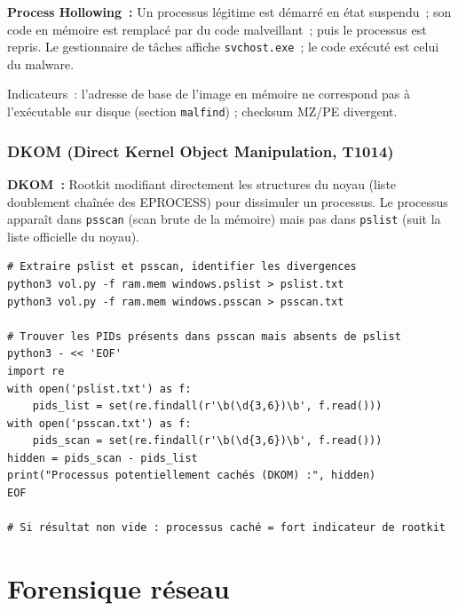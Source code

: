 \begin{boxdef}
\textbf{Process Hollowing~:} Un processus légitime est démarré en état
suspendu~; son code en mémoire est remplacé par du code malveillant~;
puis le processus est repris. Le gestionnaire de tâches affiche
\texttt{svchost.exe}~; le code exécuté est celui du malware.
\end{boxdef}

Indicateurs~: l'adresse de base de l'image en mémoire ne correspond
pas à l'exécutable sur disque (section \texttt{malfind}) ; checksum MZ/PE
divergent.

\subsubsection{DKOM (Direct Kernel Object Manipulation, T1014)}

\begin{boxdef}
\textbf{DKOM~:} Rootkit modifiant directement les structures du noyau
(liste doublement chaînée des EPROCESS) pour dissimuler un processus.
Le processus apparaît dans \texttt{psscan} (scan brute de la mémoire)
mais pas dans \texttt{pslist} (suit la liste officielle du noyau).
\end{boxdef}

\begin{lstlisting}[style=StyleTerminal,
  caption={Détection DKOM --- comparaison pslist vs psscan},
  label={lst:dkom-detection}]
# Extraire pslist et psscan, identifier les divergences
python3 vol.py -f ram.mem windows.pslist > pslist.txt
python3 vol.py -f ram.mem windows.psscan > psscan.txt

# Trouver les PIDs présents dans psscan mais absents de pslist
python3 - << 'EOF'
import re
with open('pslist.txt') as f:
    pids_list = set(re.findall(r'\b(\d{3,6})\b', f.read()))
with open('psscan.txt') as f:
    pids_scan = set(re.findall(r'\b(\d{3,6})\b', f.read()))
hidden = pids_scan - pids_list
print("Processus potentiellement cachés (DKOM) :", hidden)
EOF

# Si résultat non vide : processus caché = fort indicateur de rootkit
\end{lstlisting}

\section{Forensique réseau}
\label{sec:forensics-net}

